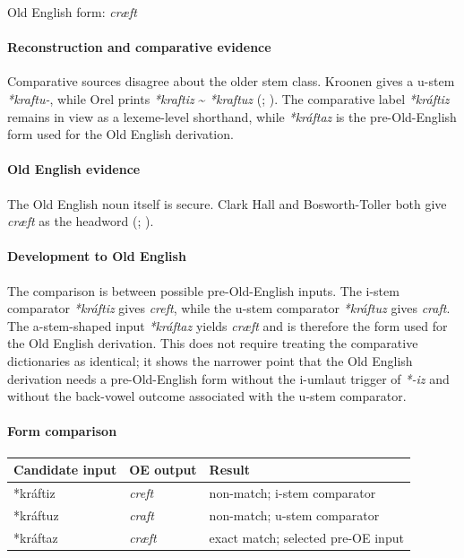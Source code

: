\documentclass[
  british,
  a4paper,
]{article}
\newcounter{none} %
\begin{document}
Old English form: \emph{cræft}

\paragraph{Reconstruction and comparative
evidence}\label{reconstruction-and-comparative-evidence-7}

Comparative sources disagree about the older stem class. Kroonen gives a
u-stem \emph{*kraftu-}, while Orel prints \emph{*kraftiz}
\textasciitilde{} \emph{*kraftuz} (; ). The comparative
label \emph{*kráftiz} remains in view as a lexeme-level shorthand, while
\emph{*kráftaz} is the pre-Old-English form used for the Old English
derivation.

\paragraph{Old English evidence}\label{old-english-evidence-7}

The Old English noun itself is secure. Clark Hall and Bosworth-Toller
both give \emph{cræft} as the headword
(;
).

\paragraph{Development to Old
English}\label{development-to-old-english-7}

The comparison is between possible pre-Old-English inputs. The i-stem
comparator \emph{*kráftiz} gives \emph{creft}, while the u-stem
comparator \emph{*kráftuz} gives \emph{craft}. The a-stem-shaped input
\emph{*kráftaz} yields \emph{cræft} and is therefore the form used for
the Old English derivation. This does not require treating the
comparative dictionaries as identical; it shows the narrower point that
the Old English derivation needs a pre-Old-English form without the
i-umlaut trigger of \emph{*-iz} and without the back-vowel outcome
associated with the u-stem comparator.

\paragraph{Form comparison}\label{form-comparison-1}

{\def\LTcaptype{none} %
\begin{longtable}[]{@{}lll@{}}
\toprule\noalign{}
Candidate input & OE output & Result \\
\midrule\noalign{}
\endhead
\bottomrule\noalign{}
\endlastfoot
*kráftiz & \emph{creft} & non-match; i-stem comparator \\
*kráftuz & \emph{craft} & non-match; u-stem comparator \\
*kráftaz & \emph{cræft} & exact match; selected pre-OE input \\
\end{longtable}
}
\end{document}
